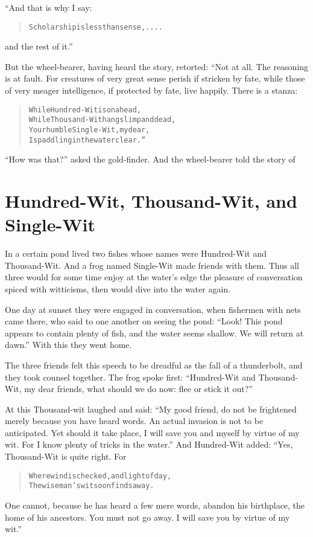 \documentclass[article, twoside, 14pt]{memoir}
\renewenvironment{verbatim}{%
\begin{quote}%
\vskip -10pt%
\begin{alltt}\normalfont\large}{\end{alltt}%
\end{quote}%
\vskip -10pt
} %
\begin{document}
“And that is why I say:

\begin{verbatim}
Scholarship is less than sense, ....
\end{verbatim}
and the rest of it.”

But the wheel-bearer, having heard the story, retorted: “Not at
all. The reasoning is at fault. For creatures of very great sense
perish if stricken by fate, while those of very meager
intelligence, if protected by fate, live happily. There is a
stanza:

\begin{verbatim}
While Hundred-Wit is on a head,
While Thousand-Wit hangs limp and dead,
Your humble Single-Wit, my dear,
Is paddling in the water clear.”
\end{verbatim}
``How was that?'' asked the gold-finder. And the wheel-bearer told
the story of

\chapter{Hundred-Wit, Thousand-Wit, and Single-Wit}

\label{s83}

In a certain pond lived two fishes whose names were
Hundred-Wit and Thousand-Wit. And a frog named Single-Wit made
friends with them. Thus all three would for some time enjoy at the
water's edge the pleasure of conversation spiced with witticisms,
then would dive into the water again.

One day at sunset they were engaged in conversation, when fishermen
with nets came there, who said to one another on seeing the pond:
``Look! This pond appears to contain plenty of fish, and the water seems shallow. We will return at dawn.''
With this they went home.

The three friends felt this speech to be dreadful as the fall of a
thunderbolt, and they took counsel together. The frog spoke first:
``Hundred-Wit and Thousand-Wit, my dear friends, what should we do now: flee or stick it out?''

At this Thousand-wit laughed and said:
``My good friend, do not be frightened merely because you have heard words. An actual invasion is not to be anticipated. Yet should it take place, I will save you and myself by virtue of my wit. For I know plenty of tricks in the water.''
And Hundred-Wit added: “Yes, Thousand-Wit is quite right. For

\begin{verbatim}
Where wind is checked, and light of day,
The wise man's wit soon finds a way.
\end{verbatim}
One cannot, because he has heard a few mere words, abandon his
birthplace, the home of his ancestors. You must not go away. I will
save you by virtue of my wit.”
\end{document}
